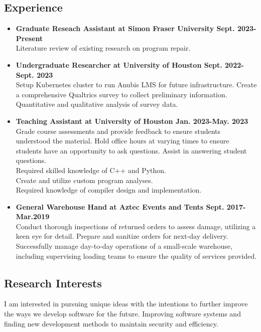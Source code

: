 \documentclass[12pt]{article}
\begin{document}
    \subsection*{Experience}
    \begin{itemize}[leftmargin=0em]
        \item[] \textbf{Graduate Reseach Assistant at Simon Fraser University \hfill Sept. 2023-Present} \\
        Literature review of existing research on program repair.

        \item[] \textbf{Undergraduate Researcher at University of Houston \hfill Sept. 2022-Sept. 2023} \\
        Setup Kubernetes cluster to run Anubis LMS for future infrastructure.
        Create a comprehensive Qualtrics survey to collect preliminary information.
        Quantitative and qualitative analysis of survey data.

        \item[] \textbf{Teaching Assistant at University of Houston \hfill Jan.  2023-May. 2023} \\
        Grade course assessments and provide feedback to ensure students understood the material.
        Hold office hours at varying times to ensure students have an opportunity to ask questions.
        Assist in answering student questions.\\
        Required skilled knowledge of C++ and Python.\\
        Create and utilize custom program analyses.\\
        Required knowledge of compiler design and implementation.

        \item[] \textbf{General Warehouse Hand at Aztec Events and Tents \hfill Sept. 2017-Mar.2019} \\
        Conduct thorough inspections of returned orders to assess damage, utilizing a keen eye for detail.
        Prepare and sanitize orders for next-day delivery.
        Successfully manage day-to-day operations of a small-scale warehouse, including supervising loading teams to ensure the quality of services provided.
    \end{itemize}

    \subsection*{Research Interests}
    I am interested in pursuing unique ideas with the intentions to further improve the ways we 
    develop software for the future. Improving software systems and finding new development 
    methods to maintain security and efficiency.

    
    
\end{document}
